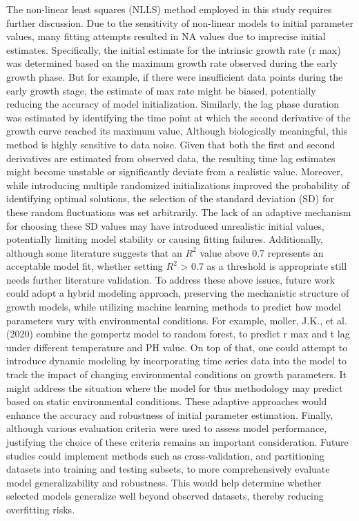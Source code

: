 \documentclass{article}
\begin{document}
The non-linear least squares (NLLS) method employed in this study requires further discussion. Due to the sensitivity of non-linear models to initial parameter values, many fitting attempts resulted in NA values due to imprecise initial estimates. Specifically, the initial estimate for the intrinsic growth rate (r max) was determined based on the maximum growth rate observed during the early growth phase. But for example, if there were insufficient data points during the early growth stage, the estimate of max rate might be biased, potentially reducing the accuracy of model initialization. Similarly, the lag phase duration  was estimated by identifying the time point at which the second derivative of the growth curve reached its maximum value, Although biologically meaningful, this method is highly sensitive to data noise. Given that both the first and second derivatives are estimated from observed data, the resulting time lag estimates might become unstable or significantly deviate from a realistic value. Moreover, while introducing multiple randomized initializations improved the probability of identifying optimal solutions, the selection of the standard deviation (SD) for these random fluctuations was set arbitrarily. The lack of an adaptive mechanism for choosing these SD values may have introduced unrealistic initial values, potentially limiting model stability or causing fitting failures. Additionally, although some literature suggests that an \( R^2 \) value above 0.7 represents an acceptable model fit, whether setting \( R^2 \)  > 0.7 as a threshold is appropriate still needs further literature validation. To address these above issues, future work could adopt a hybrid modeling approach, preserving the mechanistic structure of growth models, while utilizing machine learning methods to predict how model parameters vary with environmental conditions. For example, moller, J.K., et al.(2020) combine the gompertz model to random forest, to predict r max and t lag under different temperature and PH value. On top of that, one could attempt to introduce dynamic modeling by incorporating time series data into the model to track the impact of changing environmental conditions on growth parameters. It might address the situation where the model for thus methodology may predict based on static environmental conditions. These adaptive approaches would enhance the accuracy and robustness of initial parameter estimation.
Finally, although various evaluation criteria were used to assess model performance, justifying the choice of these criteria remains an important consideration. Future studies could implement methods such as cross-validation, and partitioning datasets into training and testing subsets, to more comprehensively evaluate model generalizability and robustness. This would help determine whether selected models generalize well beyond observed datasets, thereby reducing overfitting risks.
\end{document}
